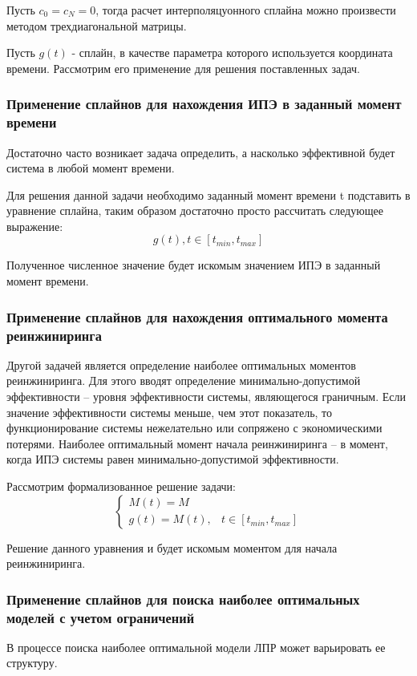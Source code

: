 Пусть $c_{0} = c_{N} = 0$, тогда расчет интерполяцуонного сплайна можно произвести методом трехдиагональной матрицы.

Пусть $g(t)$ - сплайн, в качестве параметра которого используется координата времени. Рассмотрим его применение для решения поставленных задач.

\subsubsection{Применение сплайнов для нахождения ИПЭ в заданный момент времени}
Достаточно часто возникает задача определить, а насколько эффективной будет система в любой момент времени. 

Для решения данной задачи необходимо заданный момент времени t подставить в уравнение сплайна, таким образом достаточно просто рассчитать следующее выражение:
\begin{equation}
    g(t), t \in [t_{min},t_{max}]
\end{equation}

Полученное численное значение будет искомым значением ИПЭ в заданный момент времени.

\subsubsection{Применение сплайнов для нахождения оптимального момента реинжиниринга}

Другой задачей является определение наиболее оптимальных моментов реинжиниринга.
Для этого вводят определение минимально-допустимой эффективности – уровня эффективности системы, являющегося граничным. 
Если значение эффективности системы меньше, чем этот показатель, то функционирование системы нежелательно или сопряжено с экономическими потерями. 
Наиболее оптимальный момент начала реинжиниринга – в момент, когда ИПЭ системы равен минимально-допустимой эффективности.

Рассмотрим формализованное решение задачи:\begin{equation}
    \begin{cases}
        M(t)=M  \\
        g(t)=M(t), & t \in [t_{min},t_{max}]
    \end{cases}
\end{equation}

Решение данного уравнения и будет искомым моментом для начала реинжиниринга.


\subsubsection{Применение сплайнов для поиска наиболее оптимальных моделей с учетом ограничений}
В процессе поиска наиболее оптимальной модели ЛПР может варьировать ее структуру.

